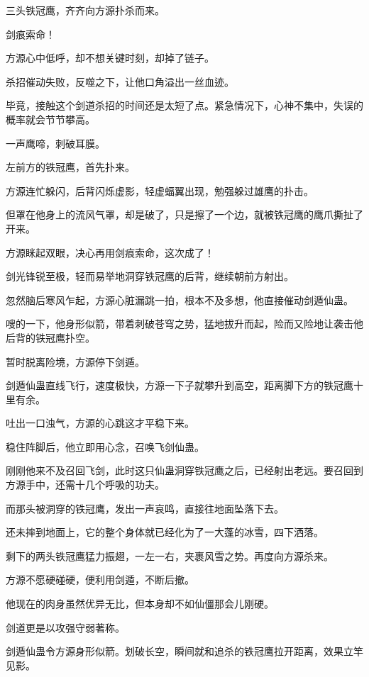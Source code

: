 
\begin{this_body}

三头铁冠鹰，齐齐向方源扑杀而来。

剑痕索命！

方源心中低呼，却不想关键时刻，却掉了链子。

杀招催动失败，反噬之下，让他口角溢出一丝血迹。

毕竟，接触这个剑道杀招的时间还是太短了点。紧急情况下，心神不集中，失误的概率就会节节攀高。

一声鹰啼，刺破耳膜。

左前方的铁冠鹰，首先扑来。

方源连忙躲闪，后背闪烁虚影，轻虚蝠翼出现，勉强躲过雄鹰的扑击。

但罩在他身上的流风气罩，却是破了，只是擦了一个边，就被铁冠鹰的鹰爪撕扯了开来。

方源眯起双眼，决心再用剑痕索命，这次成了！

剑光锋锐至极，轻而易举地洞穿铁冠鹰的后背，继续朝前方射出。

忽然脑后寒风乍起，方源心脏漏跳一拍，根本不及多想，他直接催动剑遁仙蛊。

嗖的一下，他身形似箭，带着刺破苍穹之势，猛地拔升而起，险而又险地让袭击他后背的铁冠鹰扑空。

暂时脱离险境，方源停下剑遁。

剑遁仙蛊直线飞行，速度极快，方源一下子就攀升到高空，距离脚下方的铁冠鹰十里有余。

吐出一口浊气，方源的心跳这才平稳下来。

稳住阵脚后，他立即用心念，召唤飞剑仙蛊。

刚刚他来不及召回飞剑，此时这只仙蛊洞穿铁冠鹰之后，已经射出老远。要召回到方源手中，还需十几个呼吸的功夫。

而那头被洞穿的铁冠鹰，发出一声哀鸣，直接往地面坠落下去。

还未摔到地面上，它的整个身体就已经化为了一大蓬的冰雪，四下洒落。

剩下的两头铁冠鹰猛力振翅，一左一右，夹裹风雪之势。再度向方源杀来。

方源不愿硬碰硬，便利用剑遁，不断后撤。

他现在的肉身虽然优异无比，但本身却不如仙僵那会儿刚硬。

剑道更是以攻强守弱著称。

剑遁仙蛊令方源身形似箭。划破长空，瞬间就和追杀的铁冠鹰拉开距离，效果立竿见影。


\end{this_body}
